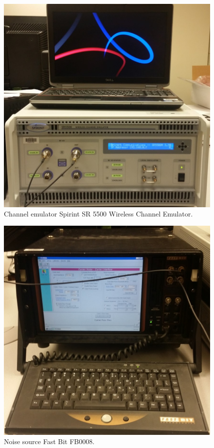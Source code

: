 \begin{figure}
	\centering\includegraphics[scale=0.5]{figures/eq_GPUimplementation/emu.jpg}
	\caption{Channel emulator Spirint SR 5500 Wireless Channel Emulator.}
	\label{fig:emu}
\end{figure}
\begin{figure}
	\centering\includegraphics[scale=0.5]{figures/eq_GPUimplementation/noise.jpg}
	\caption{Noise source Fast Bit FB0008.}
	\label{fig:noise}
\end{figure}
